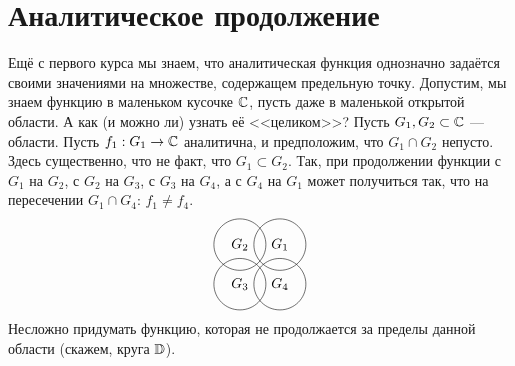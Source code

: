 \documentclass[a4paper]{report}
\begin{document}
    \section{Аналитическое продолжение}
    Ещё с первого курса мы знаем, что аналитическая функция однозначно задаётся своими значениями на множестве, содержащем предельную точку.
    Допустим, мы знаем функцию в маленьком кусочке $\mathbb{C}$, пусть даже в маленькой открытой области.
    А как (и можно ли) узнать её <<целиком>>?
    Пусть $G_1, G_2 \subset \mathbb{C}$ --- области.
    Пусть $f_1: G_1 \rightarrow \mathbb{C}$ аналитична, и предположим, что $G_1 \cap G_2$ непусто.
    Здесь существенно, что не факт, что $G_1 \subset G_2$.
    Так, при продолжении функции с $G_1$ на $G_2$, с $G_2$ на $G_3$, с $G_3$ на $G_4$, а с $G_4$ на $G_1$ может получиться так, что на пересечении $G_1 \cap G_4$: $f_1 \ne f_4$.
    \[\begin{tikzpicture}
        \draw (0.5, 0.5) circle (0.65) node {$G_1$};
        \draw (-0.5, 0.5) circle (0.65) node {$G_2$};
        \draw (-0.5, -0.5) circle (0.65) node {$G_3$};
        \draw (0.5, -0.5) circle (0.65) node {$G_4$};
    \end{tikzpicture}\]
    Несложно придумать функцию, которая не продолжается за пределы данной области (скажем, круга $\mathbb{D}$).
\end{document}
